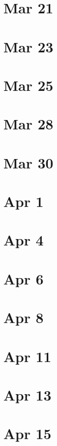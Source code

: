 \documentclass{amsart}
\newcommand{\<}{\langle}
\renewcommand{\>}{\rangle}
\numberwithin{equation}{section}
\theoremstyle{plain}
\theoremstyle{definition}
\theoremstyle{remark}
\begin{document}
\section{Mar 21}

\section{Mar 23}

\section{Mar 25}

\section{Mar 28}

\section{Mar 30}

\section{Apr 1}

\section{Apr 4}

\section{Apr 6}

\section{Apr 8}

\section{Apr 11}

\section{Apr 13}

\section{Apr 15}
\end{document}
